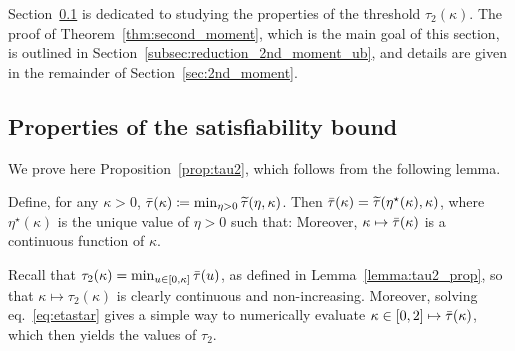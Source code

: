Section~\ref{subsec:proof_properties_tau2} is dedicated to studying the properties of the threshold $\tau_2(\kappa)$. 
The proof of Theorem~\ref{thm:second_moment}, which is the main goal of this section, is outlined in Section~\ref{subsec:reduction_2nd_moment_ub},
and details are given in the remainder of Section~\ref{sec:2nd_moment}.

\subsection{Properties of the satisfiability bound}\label{subsec:proof_properties_tau2}

We prove here Proposition~\ref{prop:tau2}, which follows from the following lemma.
\begin{lemma}\label{lemma:tau2_prop}
    Define, for any $\kappa > 0$, ${\bar{\tau}}(\kappa) \coloneqq \min_{\eta > 0} {\widetilde{\tau}}(\eta, \kappa)$.
    Then ${\bar{\tau}}(\kappa) = {\widetilde{\tau}}(\eta^\star(\kappa),\kappa)$,
where
$\eta^\star(\kappa)$ is the unique value of $\eta > 0$ such that:
Moreover, $\kappa \mapsto {\bar{\tau}}(\kappa)$ is a continuous function of $\kappa$.
\end{lemma}
\noindent
Recall that $\tau_2(\kappa) = \min_{u \in [0,\kappa]} {\bar{\tau}}(u)$, as defined in Lemma~\ref{lemma:tau2_prop}, 
so that $\kappa \mapsto \tau_2(\kappa)$ is clearly continuous and non-increasing.
Moreover, solving eq.~\eqref{eq:etastar} gives a simple way to numerically evaluate $\kappa \in [0,2] \mapsto {\bar{\tau}}(\kappa)$, which then yields the values of $\tau_2$.

